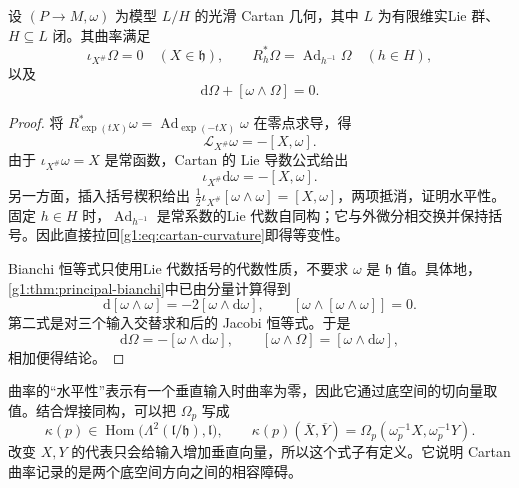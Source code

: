 \begin{proposition}\label{g1:prop:cartan-curvature-identities}
	设 \((P\to M,\omega)\) 为模型 \(L/H\) 的光滑 Cartan 几何，其中 \(L\) 为有限维实Lie 群、\(H\subseteq L\) 闭。其曲率满足
	\begin{equation}\label{g1:eq:cartan-curvature-properties}
		\iota_{X^\#}\Omega=0\quad(X\in\mathfrak h),\qquad
		R_h^*\Omega=\operatorname{Ad}_{h^{-1}}\Omega\quad(h\in H),
	\end{equation}
	以及
	\begin{equation}\label{g1:eq:cartan-bianchi}
		\mathrm{d}\Omega+[\omega\wedge\Omega]=0.
	\end{equation}
\end{proposition}
\begin{proof}
	将 \(R_{\exp(tX)}^*\omega=\operatorname{Ad}_{\exp(-tX)}\omega\) 在零点求导，得
	\[
		\mathcal L_{X^\#}\omega=-[X,\omega].
	\]
	由于 \(\iota_{X^\#}\omega=X\) 是常函数，Cartan 的 Lie 导数公式给出
	\[
		\iota_{X^\#}\mathrm{d}\omega=-[X,\omega].
	\]
	另一方面，插入括号楔积给出
	\(\frac12\iota_{X^\#}[\omega\wedge\omega]=[X,\omega]\)，两项抵消，证明水平性。固定 \(h\in H\) 时，\(\operatorname{Ad}_{h^{-1}}\) 是常系数的Lie 代数自同构；它与外微分相交换并保持括号。因此直接拉回\eqref{g1:eq:cartan-curvature}即得等变性。

	Bianchi 恒等式只使用Lie 代数括号的代数性质，不要求 \(\omega\) 是 \(\mathfrak h\) 值。具体地，\cref{g1:thm:principal-bianchi}中已由分量计算得到
	\[
		\mathrm{d}[\omega\wedge\omega]
		=-2[\omega\wedge\mathrm{d}\omega],
		\qquad
		[\omega\wedge[\omega\wedge\omega]]=0.
	\]
	第二式是对三个输入交替求和后的 Jacobi 恒等式。于是
	\[
		\mathrm{d}\Omega=-[\omega\wedge\mathrm{d}\omega],
		\qquad
		[\omega\wedge\Omega]=[\omega\wedge\mathrm{d}\omega],
	\]
	相加便得结论。
\end{proof}

曲率的“水平性”表示有一个垂直输入时曲率为零，因此它通过底空间的切向量取值。结合焊接同构，可以把 \(\Omega_p\) 写成
\[
	\kappa(p)\in
	\operatorname{Hom}\bigl(\Lambda^2(\mathfrak l/\mathfrak h),\mathfrak l\bigr),
	\qquad
	\kappa(p)(\overline X,\overline Y)
	=\Omega_p(\omega_p^{-1}X,\omega_p^{-1}Y).
\]
改变 \(X,Y\) 的代表只会给输入增加垂直向量，所以这个式子有定义。它说明 Cartan 曲率记录的是两个底空间方向之间的相容障碍。

